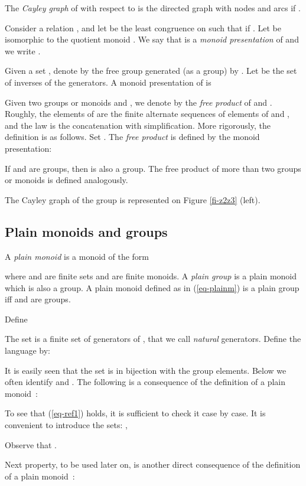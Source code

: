\documentclass[11pt,a4paper]{article}
\theoremstyle{remark}
\def\eref#1{(\ref{#1})}
\begin{document}
The {\em Cayley graph}  of  with respect to
 is the directed graph with nodes  and arcs
 if .

\medskip

Consider a relation , and let
 be the least congruence on  such that  if . Let  be isomorphic to the quotient monoid
. We say that  is a {\em
  monoid presentation} of 
and we write .

Given a set , denote by  the free group generated (as a
group) by . Let  be the set of inverses of the
generators. A monoid presentation of  is


Given two groups or monoids  and , we denote by
 the {\em free product} of  and . Roughly,
the elements of  are the finite alternate sequences
of elements of  and ,
and the law is the concatenation with simplification. More
rigorously, the definition is as follows. Set .
The {\em free  product}  is defined by the monoid
presentation:

If  and  are groups, then  is also a
group. The free product of more than two groups or monoids is
defined analogously.

The Cayley graph of the group  is
represented on Figure \ref{fi-z2z3} (left). 

\subsection{Plain monoids and groups}\label{sse-pmg}

A {\em plain monoid} is a monoid  of the form

where  and  are finite sets and  are finite
monoids. A {\em plain group} is a plain monoid which is also a
group. A plain monoid  defined as in \eref{eq-plainm} is a
plain group iff  and  are groups.

Define

The set  is a finite set of generators of , that we
call {\em natural} generators. Define the language  by:

It is easily seen that the set  is in bijection with the
group elements. Below we often identify  and . 
The following is a consequence of the definition of a plain monoid~: 

To see that \eref{eq-ref1} holds, it is sufficient to check it case by
case. 
It is convenient to introduce the sets: ,

Observe that .

Next property, to be used later on, is another direct consequence of
the definition of a plain monoid~:
\end{document}
